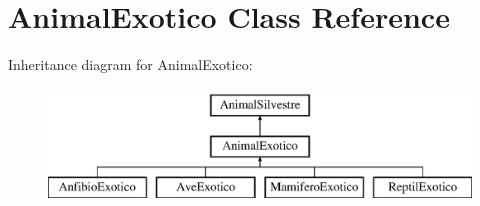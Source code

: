\hypertarget{class_animal_exotico}{}\section{Animal\+Exotico Class Reference}
\label{class_animal_exotico}
Inheritance diagram for Animal\+Exotico\+:\begin{figure}[H]
\begin{center}
\leavevmode
\includegraphics[height=3.000000cm]{class_animal_exotico}
\end{center}
\end{figure}
